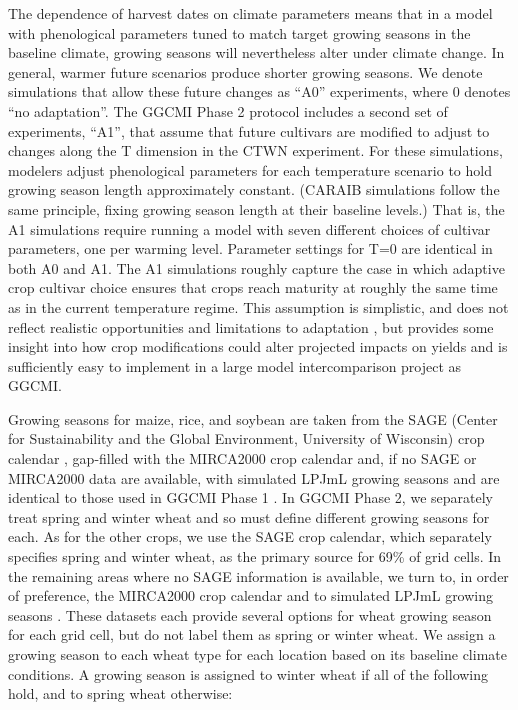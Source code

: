 \documentclass[gmd, manuscript]{copernicus} %
\begin{document}
The dependence of harvest dates on climate parameters means that in a model with phenological parameters tuned to match target growing seasons in the baseline climate, growing seasons will nevertheless alter under climate change. In general, warmer future scenarios produce shorter growing seasons.
We denote simulations that allow these future changes as ``A0'' experiments, where 0 denotes ``no adaptation''. 
 The GGCMI Phase 2 protocol includes a second set of experiments, ``A1'', that assume that future cultivars are modified to adjust to changes along the T dimension in the CTWN experiment.  %
For these simulations, modelers adjust phenological parameters for each temperature scenario to hold growing season length approximately constant. 
(CARAIB simulations follow the same principle, fixing growing season length at their baseline levels.) 
That is, the A1 simulations require running a model with seven different choices of cultivar parameters, one per warming level. Parameter settings for T=0 are identical in both A0 and A1. 
The A1 simulations roughly capture the case in which adaptive crop cultivar choice ensures that crops reach maturity at roughly the same time as in the current temperature regime. 
This assumption is simplistic, and does not reflect realistic opportunities and limitations to adaptation \citep{vadez2012adaptation,challinor2018improving}, but provides some insight into how crop modifications could alter projected impacts on yields and is sufficiently easy to implement in a large model intercomparison project as GGCMI.

Growing seasons for maize, rice, and soybean are taken from the SAGE (Center for Sustainability and the Global Environment, University of Wisconsin) crop calendar \citep{Sacks2010}, gap-filled with the MIRCA2000 crop calendar \citep{Portmann2010} and, if no SAGE or MIRCA2000 data are available, with simulated LPJmL growing seasons \citep{waha2012climate} and are identical to those used in GGCMI Phase 1 \citep{Elliott2015}.
In GGCMI Phase 2, we separately treat spring and winter wheat and so must define different growing seasons for each.
As for the other crops, we use the SAGE crop calendar, which separately specifies spring and winter wheat, as the primary source for 69\% of grid cells. 
In the remaining areas where no SAGE information is available, we turn to, in order of preference, the MIRCA2000 crop calendar \citep{Portmann2010} and to simulated LPJmL growing seasons \citep{waha2012climate}.  
These datasets each provide several options for wheat growing season for each grid cell, but do not label them as spring or winter wheat. 
We assign a growing season to each wheat type for each location based on its baseline climate conditions. 
A growing season is assigned to winter wheat if all of the following hold, and to spring wheat otherwise:
\end{document}
